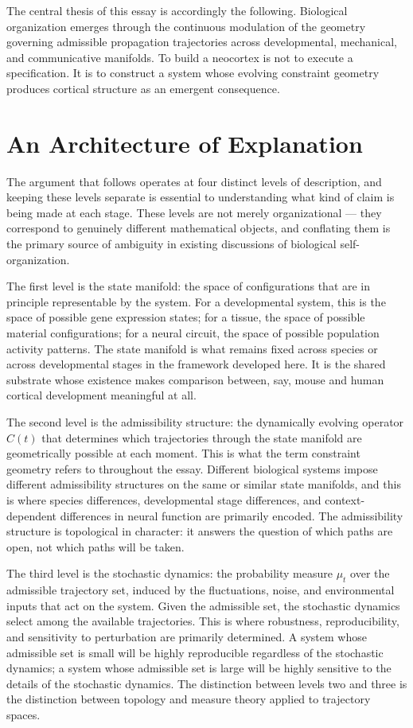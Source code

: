 \documentclass[12pt, a4paper, openany]{book}
\theoremstyle{definition}
\theoremstyle{remark}
\begin{document}
The central thesis of this essay is accordingly the following. Biological organization emerges through the continuous modulation of the geometry governing admissible propagation trajectories across developmental, mechanical, and communicative manifolds. To build a neocortex is not to execute a specification. It is to construct a system whose evolving constraint geometry produces cortical structure as an emergent consequence.

\section*{An Architecture of Explanation}

The argument that follows operates at four distinct levels of description, and keeping these levels separate is essential to understanding what kind of claim is being made at each stage. These levels are not merely organizational — they correspond to genuinely different mathematical objects, and conflating them is the primary source of ambiguity in existing discussions of biological self-organization.

The first level is the state manifold: the space of configurations that are in principle representable by the system. For a developmental system, this is the space of possible gene expression states; for a tissue, the space of possible material configurations; for a neural circuit, the space of possible population activity patterns. The state manifold is what remains fixed across species or across developmental stages in the framework developed here. It is the shared substrate whose existence makes comparison between, say, mouse and human cortical development meaningful at all.

The second level is the admissibility structure: the dynamically evolving operator $C(t)$ that determines which trajectories through the state manifold are geometrically possible at each moment. This is what the term constraint geometry refers to throughout the essay. Different biological systems impose different admissibility structures on the same or similar state manifolds, and this is where species differences, developmental stage differences, and context-dependent differences in neural function are primarily encoded. The admissibility structure is topological in character: it answers the question of which paths are open, not which paths will be taken.

The third level is the stochastic dynamics: the probability measure $\mu_t$ over the admissible trajectory set, induced by the fluctuations, noise, and environmental inputs that act on the system. Given the admissible set, the stochastic dynamics select among the available trajectories. This is where robustness, reproducibility, and sensitivity to perturbation are primarily determined. A system whose admissible set is small will be highly reproducible regardless of the stochastic dynamics; a system whose admissible set is large will be highly sensitive to the details of the stochastic dynamics. The distinction between levels two and three is the distinction between topology and measure theory applied to trajectory spaces.
\end{document}
